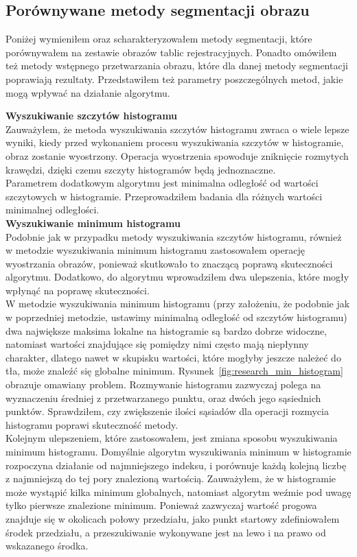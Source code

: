 \subsection{Porównywane metody segmentacji obrazu}
Poniżej wymieniłem oraz scharakteryzowałem metody segmentacji, które porównywałem na zestawie obrazów tablic rejestracyjnych. Ponadto omówiłem też metody wstępnego przetwarzania obrazu, które dla danej metody segmentacji poprawiają rezultaty. Przedstawiłem też parametry poszczególnych metod, jakie mogą wpływać na działanie algorytmu.

\textbf{Wyszukiwanie szczytów histogramu}\\
Zauważyłem, że metoda wyszukiwania szczytów histogramu zwraca o wiele lepsze wyniki, kiedy przed wykonaniem procesu wyszukiwania szczytów w histogramie, obraz zostanie wyostrzony. Operacja wyostrzenia spowoduje zniknięcie rozmytych krawędzi, dzięki czemu szczyty histogramów będą jednoznaczne. \\
Parametrem dodatkowym algorytmu jest minimalna odległość od wartości szczytowych w histogramie. Przeprowadziłem badania dla różnych wartości minimalnej odległości.\\

\textbf{Wyszukiwanie minimum histogramu}\\
Podobnie jak w przypadku metody wyszukiwania szczytów histogramu, również w metodzie wyszukiwania minimum histogramu zastosowałem operację wyostrzania obrazów, ponieważ skutkowało to znaczącą poprawą skuteczności algorytmu. Dodatkowo, do algorytmu wprowadziłem dwa ulepszenia, które mogły wpłynąć na poprawę skuteczności.\\
W metodzie wyszukiwania minimum histogramu (przy założeniu, że podobnie jak w poprzedniej metodzie, ustawimy minimalną odległość od szczytów histogramu) dwa największe maksima lokalne na histogramie są bardzo dobrze widoczne, natomiast wartości znajdujące się pomiędzy nimi często mają niepłynny charakter, dlatego nawet w skupisku wartości, które mogłyby jeszcze należeć do tła, może znaleźć się globalne minimum. Rysunek~\ref{fig:research_min_histogram} obrazuje omawiany problem. Rozmywanie histogramu zazwyczaj polega na wyznaczeniu średniej z przetwarzanego punktu, oraz dwóch jego sąsiednich punktów. Sprawdziłem, czy zwiększenie ilości sąsiadów dla operacji rozmycia histogramu poprawi skuteczność metody.\\
Kolejnym ulepszeniem, które zastosowałem, jest zmiana sposobu wyszukiwania minimum histogramu. Domyślnie algorytm wyszukiwania minimum w histogramie rozpoczyna działanie od najmniejszego indeksu, i porównuje każdą kolejną liczbę z najmniejszą do tej pory znalezioną wartością. Zauważyłem, że w histogramie może wystąpić kilka minimum globalnych, natomiast algorytm weźmie pod uwagę tylko pierwsze znalezione minimum. Ponieważ zazwyczaj wartość progowa znajduje się w okolicach połowy przedziału, jako punkt startowy zdefiniowałem środek przedziału, a przeszukiwanie wykonywane jest na lewo i na prawo od wskazanego środka.

